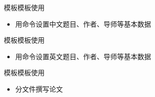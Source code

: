 \documentclass[fontset = none, xcolor=svgnames, t, aspectratio=169]{ctexbeamer}
\begin{document}
\begin{frame}[fragile]{\nwafuthesis 模板}{模板使用}
  \begin{itemize}  
  \item 用\texinline{\nwafuset}命令设置中文题目、作者、导师等基本数据
  \end{itemize}
  \vspace{-1ex}
  \begin{center}
    \begin{minipage}[h]{0.75\linewidth}
    \end{minipage}
  \end{center}
\end{frame}

\begin{frame}[fragile]{\nwafuthesis 模板}{模板使用}
  \begin{itemize}  
  \item 用\texinline{\nwafusetEn}命令设置英文题目、作者、导师等基本数据
  \end{itemize}
  \begin{center}
    \begin{minipage}[h]{0.95\linewidth}      
    \end{minipage}
  \end{center}
\end{frame}

\begin{frame}[fragile]{\nwafuthesis 模板}{模板使用}
  \begin{itemize}  
  \item 分文件撰写论文
  \end{itemize}
  \vspace{-1ex}
  \begin{multicols}{2}
  \end{multicols}
\end{frame}
\end{document}
